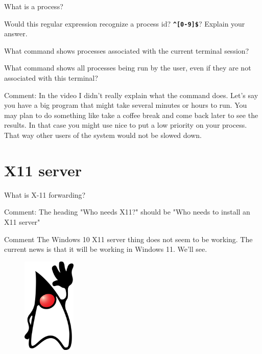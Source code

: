 \documentclass[letterpaper,12pt]{exam}
\begin{document}
\begin {questions}
\question What is a process?
\vspace{10mm}

\question Would this regular expression recognize a process id?  \texttt{\textbf{\textquotesingle\^{}[0-9]\$\textquotesingle}}?  Explain your answer.
\vspace{10mm}

\question What command shows processes associated with the current terminal session?
\vspace{5mm}

\question What command shows all processes being run by the user, even if they are not associated with this terminal?
\vspace{5mm}

\noindent Comment:  In the video I didn't really explain what the  command does.  Let's say you have a big program that might take several minutes or hours to run.  You may plan to do something like take a coffee break and come back later to see the results.  In that case you might use nice to put a low priority on your process.  That way other users of the system would not be slowed down.

\section*{X11 server}

\begin{samepage}
\question What is X-11 forwarding? 
\vspace{5mm}
\end{samepage}
\noindent Comment:  The heading "Who needs X11?" should be "Who needs to install an X11 server"

\noindent Comment The Windows 10 X11 server thing does not seem to be working.  The current news is that it will be working in Windows 11.  We'll see.

\end{questions}
\noindent 

\begin{figure}[b]\label{end}
	\center
	\includegraphics[width=1in]{../duke.png}
\end{figure}
\end{document}
